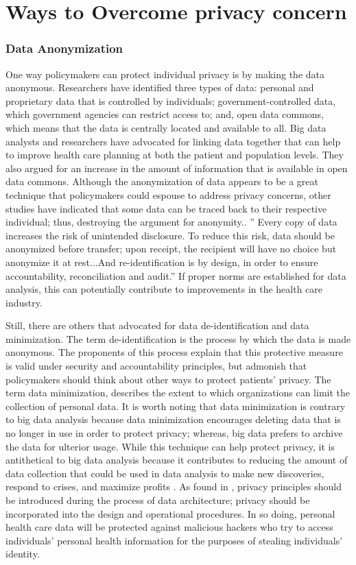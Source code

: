 \documentclass[sigconf]{acmart}
\begin{document}
\section{Ways to Overcome privacy concern}
\subsubsection{Data Anonymization}
One way policymakers can protect individual privacy is by making the data anonymous. Researchers have identified three types of data: personal and proprietary data that is controlled by individuals; government-controlled data, which government agencies can restrict access to; and, open data commons, which means that the data is centrally located and available to all. Big data analysts and researchers have advocated for linking data together that can help to improve health care planning at both the patient and population levels. They also argued for an increase in the amount of information that is available in open data commons. Although the anonymization of data appears to be a great technique that policymakers could espouse to address privacy concerns, other studies have indicated that some data can be traced back to their respective individual; thus, destroying the argument for anonymity.\cite{van2011health}. '' Every copy of data increases the risk of unintended disclosure. To reduce this risk, data should be anonymized before transfer; upon receipt, the recipient will have no choice but anonymize it at rest...And re-identification is by design, in order to ensure accountability, reconciliation and audit.'' If proper norms are established for data analysis, this can potentially contribute to improvements in the health care industry. 

Still, there are others that advocated for data de-identification and data minimization. The term de-identification is the process by which the data is made anonymous. The proponents of this process explain that this protective measure is valid under security and accountability principles, but admonish that policymakers should think about other ways to protect patients’ privacy. The term data minimization, describes the extent to which organizations can limit the collection of personal data. It is worth noting that data minimization is contrary to big data analysis because data minimization encourages deleting data that is no longer in use in order to protect privacy; whereas, big data prefers to archive the data for ulterior usage. While this technique can help protect privacy, it is antithetical to big data analysis because it contributes to reducing the amount of data collection that could be used in data analysis to make new discoveries, respond to crises, and maximize profits \cite{tene2012big}. 
As found in \cite{cavoukian2012privacy}, privacy principles should be introduced during the process of data architecture; privacy should be incorporated into the design and operational procedures. In so doing, personal health care data will be protected against malicious hackers who try to access individuals’ personal health information for the purposes of stealing individuals’ identity. 
\end{document}
